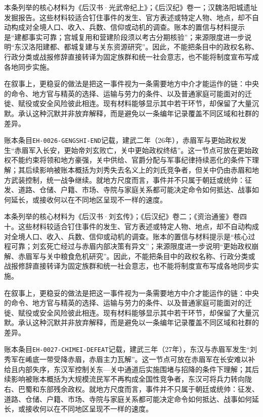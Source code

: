 本条列举的核心材料为《后汉书·光武帝纪上》；《后汉纪》卷一；汉魏洛阳城遗址发掘报告。这些材料较适合钉住事件的发生、官方表述或特定人物、地点，却不自动构成对全境人口、收入、兵数、信仰或动机的调查。账本的置信与材料提示是“建都事实可靠；宫城复用和营建阶段须以考古分期核验”；来源限度进一步说明“东汉洛阳建都、都城复建与关东资源研究”。因此，不能把条目中的政权名称、行政分类或战报修辞直接转译为固定族群和统一社会意志，也不能将制度宣布写成各地同步实施。

在叙事上，更稳妥的做法是把这一事件视为一条需要地方中介才能运作的链：中央的命令、地方官与精英的选择、运输与劳力的条件、以及普通家庭可能面对的迁徙、赋役或安全风险彼此相连。现有材料能够显示其中若干环节，却保留了大量沉默。承认这种沉默并非放弃解释，而是避免以一条编年记录覆盖不同区域和社群的差异。

账本条目\texttt{EH-0026-GENGSHI-END}记载，建武二年（26年），赤眉军与更始政权发生“赤眉军入长安，更始帝刘玄败亡，关中更始政权终结”。这一节点可放在更始政权不能约束将领和地方豪强，关中供给、官爵分配与军事纪律持续恶化的条件下理解；其后续影响被账本概括为刘秀失去名义上的刘氏竞争者，但关中仍由赤眉和地方武装控制，统一战争继续。就地方尺度而言，事件并不只属于朝廷或统帅：征发、道路、仓储、户籍、市场、寺院与家庭关系都可能决定命令如何抵达、战事如何延长，或接收何以在不同地区呈现不一样的速度。

本条列举的核心材料为《后汉书·刘玄传》；《后汉纪》卷二；《资治通鉴》卷四十。这些材料较适合钉住事件的发生、官方表述或特定人物、地点，却不自动构成对全境人口、收入、兵数、信仰或动机的调查。账本的置信与材料提示是“核心过程可靠；刘玄死亡经过与赤眉内部决策有异文”；来源限度进一步说明“更始政权崩解、赤眉军与关中粮食危机研究”。因此，不能把条目中的政权名称、行政分类或战报修辞直接转译为固定族群和统一社会意志，也不能将制度宣布写成各地同步实施。

在叙事上，更稳妥的做法是把这一事件视为一条需要地方中介才能运作的链：中央的命令、地方官与精英的选择、运输与劳力的条件、以及普通家庭可能面对的迁徙、赋役或安全风险彼此相连。现有材料能够显示其中若干环节，却保留了大量沉默。承认这种沉默并非放弃解释，而是避免以一条编年记录覆盖不同区域和社群的差异。

账本条目\texttt{EH-0027-CHIMEI-DEFEAT}记载，建武三年（27年），东汉与赤眉军发生“刘秀军在崤底一带受降赤眉，赤眉主力瓦解”。这一节点可放在赤眉军在长安难以补给且内部失序，东汉军控制关东—关中通道后实施围堵与招降的条件下理解；其后续影响被账本概括为大规模流民军不再构成全国性竞争者，东汉可将兵力转向陇右、巴蜀和东部残余政权。就地方尺度而言，事件并不只属于朝廷或统帅：征发、道路、仓储、户籍、市场、寺院与家庭关系都可能决定命令如何抵达、战事如何延长，或接收何以在不同地区呈现不一样的速度。

